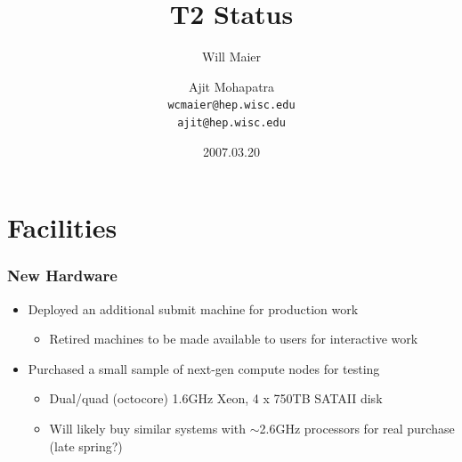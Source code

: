 \documentclass{beamer}
\title{T2 Status}
\author[Maier, Mohapatra]{
    Will Maier \and Ajit Mohapatra\\ 
    {\tt wcmaier@hep.wisc.edu}\\
    {\tt ajit@hep.wisc.edu}}
\institute[Wisconsin]{University of Wisconsin - High Energy Physics}
\date{2007.03.20}
\newcommand{\ca}{\ensuremath{\sim}}
\begin{document}
\begin{frame}
    \titlepage
\end{frame}


\section{Facilities}
\begin{frame}
    \frametitle{New Hardware}
    \begin{itemize}
        \item Deployed an additional submit machine for production work
        \begin{itemize}
            \item Retired machines to be made available to users for interactive work
        \end{itemize}
        \item Purchased a small sample of next-gen compute nodes for testing
        \begin{itemize}
            \item Dual/quad (octocore) 1.6GHz Xeon, 4 x 750TB SATAII disk
            \item Will likely buy similar systems with \ca{}2.6GHz processors for real purchase (late spring?)
        \end{itemize}
    \end{itemize}
\end{frame}
\end{document}
